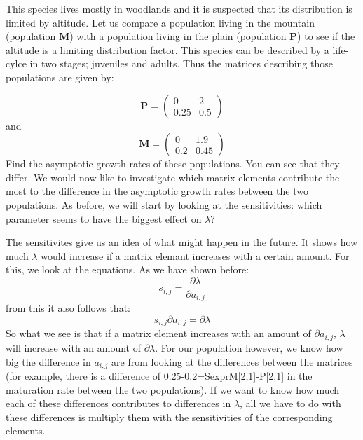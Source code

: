 \documentclass{article}\usepackage[]{graphicx}\usepackage[]{color}
\begin{document}
This species lives mostly in woodlands and it is suspected that its distribution is limited by altitude. Let us compare a population living in the mountain (population $\boldsymbol{M}$) with a population living in the plain (population $\boldsymbol{P}$) to see if the altitude is a limiting distribution factor. This species can be described by a life-cylce in two stages; juveniles and adults. Thus the matrices describing those populations are given by:

\begin{equation}
\boldsymbol{P}=\begin{pmatrix}
0&2\\
0.25&0.5
\end{pmatrix}
\end{equation}
and
\begin{equation}
\boldsymbol{M}=\begin{pmatrix}
0&1.9\\
0.2&0.45
\end{pmatrix}
\end{equation}
Find the asymptotic growth rates of these populations. You can see that they differ. We would now like to investigate which matrix elements contribute the most to the difference in the asymptotic growth rates between the two populations. As before, we will start by looking at the sensitivities: which parameter seems to have the biggest effect on $\lambda$?

The sensitivites give us an idea of what might happen in the future. It shows how much $\lambda$ would increase if a matrix elemant increases with a certain amount. For this, we look at the equations. As we have shown before:
\begin{equation}
s_{i,j} = \frac{\partial \lambda}{\partial a_{i,j}}
\end{equation}
from this it also follows that:
\begin{equation}
s_{i,j} \partial a_{i,j} = \partial \lambda
\end{equation}
So what we see is that if a matrix element increases with an amount of $\partial a_{i,j}$, $\lambda$ will increase with an amount of $\partial \lambda$. For our population however, we know how big the difference in $a_{i,j}$ are from looking at the differences between the matrices (for example, there is a difference of 0.25-0.2=Sexpr{M[2,1]-P[2,1]} in the maturation rate between the two populations). If we want to know how much each of these differences contributes to differences in $\lambda$, all we have to do with these differences is multiply them with the sensitivities of the corresponding elements.
\end{document}
